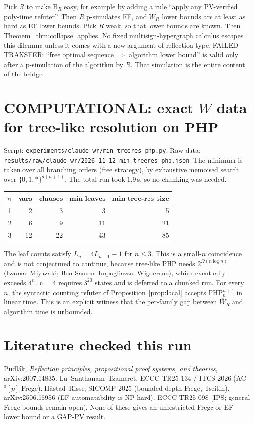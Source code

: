 \documentclass[11pt]{article}
\begin{document}
\begin{remark}
Pick $R$ to make $\mathrm B_R$ easy, for example by adding a rule ``apply any PV-verified
poly-time refuter''. Then $R$ p-simulates EF, and $\overline W_R$ lower bounds are at least
as hard as EF lower bounds. Pick $R$ weak, so that lower bounds are known. Then
Theorem~\ref{thm:collapse} applies. No fixed multisign-hypergraph calculus escapes this
dilemma unless it comes with a new argument of reflection type.
FAILED TRANSFER: ``free optimal sequence $\Rightarrow$ algorithm lower bound'' is valid only
after a p-simulation of the algorithm by $R$. That simulation is the entire content of the
bridge.
\end{remark}

\section{COMPUTATIONAL: exact $\overline W$ data for tree-like resolution on PHP}
Script: \texttt{experiments/claude\_wr/min\_treeres\_php.py}. Raw data:
\texttt{results/raw/claude\_wr/2026-11-12\_min\_treeres\_php.json}. The minimum is taken over
all branching orders (free strategy), by exhaustive memoised search over $\{0,1,*\}^{n(n+1)}$.
The total run took 1.9\,s, so no chunking was needed.
\begin{center}\begin{tabular}{rrrrr}
$n$ & vars & clauses & min leaves & min tree-res size\\\hline
1&2&3&3&5\\ 2&6&9&11&21\\ 3&12&22&43&85
\end{tabular}\end{center}
The leaf counts satisfy $L_n=4L_{n-1}-1$ for $n\le3$. This is a small-$n$ coincidence and is
not conjectured to continue, because tree-like PHP needs $2^{\Omega(n\log n)}$
(Iwama--Miyazaki; Ben-Sasson--Impagliazzo--Wigderson), which eventually exceeds $4^n$.
$n=4$ requires $3^{20}$ states and is deferred to a chunked run. For every $n$, the
syntactic counting refuter of Proposition~\ref{prop:local} accepts PHP$^{n+1}_n$ in linear
time. This is an explicit witness that the per-family gap between $\overline W_R$ and
algorithm time is unbounded.

\section*{Literature checked this run}
Pudl\'ak, \emph{Reflection principles, propositional proof systems, and theories},
arXiv:2007.14835. Lu--Santhanam--Tzameret, ECCC TR25-134 / ITCS 2026 (AC$^0[p]$-Frege).
H\aa stad--Risse, SICOMP 2025 (bounded-depth Frege, Tseitin). arXiv:2506.16956
(EF automatability is NP-hard). ECCC TR25-098 (IPS; general Frege bounds remain open).
None of these gives an unrestricted Frege or EF lower bound or a GAP-PV result.
\end{document}
